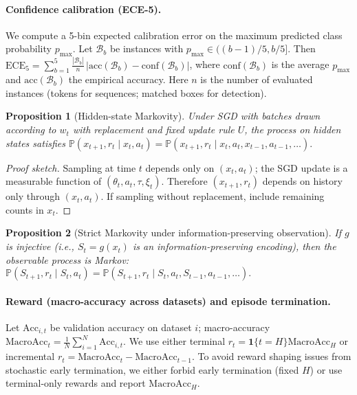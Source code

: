 \documentclass[11pt]{article}
\newtheorem{proposition}{Proposition}
\newcommand{\MacroAcc}{\mathrm{MacroAcc}}
\newcommand{\1}{\mathbf{1}}
\newcommand{\Prb}{\mathbb{P}}
\begin{document}
\paragraph{Confidence calibration (ECE-5).}
We compute a 5-bin expected calibration error on the maximum predicted class probability $p_{\max}$.
Let $\mathcal{B}_b$ be instances with $p_{\max}\in((b-1)/5,b/5]$. Then
$\mathrm{ECE}_5=\sum_{b=1}^5 \frac{|\mathcal{B}_b|}{n}\,\big|\mathrm{acc}(\mathcal{B}_b)-\mathrm{conf}(\mathcal{B}_b)\big|$,
where $\mathrm{conf}(\mathcal{B}_b)$ is the average $p_{\max}$ and $\mathrm{acc}(\mathcal{B}_b)$ the empirical accuracy.
Here $n$ is the number of evaluated instances (tokens for sequences; matched boxes for detection).

\begin{proposition}[Hidden-state Markovity]
Under SGD with batches drawn according to $w_t$ \emph{with replacement} and fixed update rule $U$, the process on hidden states satisfies
\(
\Prb(x_{t+1},r_t \mid x_t,a_t)=\Prb(x_{t+1},r_t \mid x_t,a_t,x_{t-1},a_{t-1},\dots).
\)
\end{proposition}
\begin{proof}[Proof sketch]
Sampling at time $t$ depends only on $(x_t,a_t)$; the SGD update is a measurable function of $(\theta_t,a_t,\tau,\xi_t)$.
Therefore $(x_{t+1},r_t)$ depends on history only through $(x_t,a_t)$.
If sampling without replacement, include remaining counts in $x_t$.
\end{proof}

\begin{proposition}[Strict Markovity under information-preserving observation]\label{prop:inject}
If $g$ is injective (i.e., $S_t=g(x_t)$ is an information-preserving encoding), then the observable process is Markov:
\(
\Prb(S_{t+1},r_t \mid S_t,a_t)=\Prb(S_{t+1},r_t \mid S_t,a_t,S_{t-1},a_{t-1},\dots).
\)
\end{proposition}

\paragraph{Reward (macro-accuracy across datasets) and episode termination.}
Let $\mathrm{Acc}_{i,t}$ be validation accuracy on dataset $i$; macro-accuracy $\MacroAcc_t=\frac{1}{N}\sum_{i=1}^N \mathrm{Acc}_{i,t}$.
We use either terminal $r_t=\1\{t=H\}\MacroAcc_H$ or incremental $r_t=\MacroAcc_t-\MacroAcc_{t-1}$.
To avoid reward shaping issues from stochastic early termination, we either forbid early termination (fixed $H$) or use terminal-only rewards and report $\MacroAcc_H$.
\end{document}
